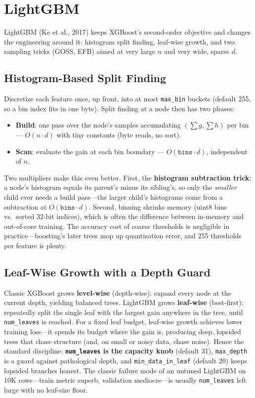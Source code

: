 \section{LightGBM}
\label{cml:sec:lightgbm}

LightGBM (Ke et al., 2017) keeps XGBoost's second-order objective and changes the engineering around it: histogram split finding, leaf-wise growth, and two sampling tricks (GOSS, EFB) aimed at very large $n$ and very wide, sparse $d$.

\subsection{Histogram-Based Split Finding}

Discretize each feature once, up front, into at most \texttt{max\_bin} buckets (default 255, so a bin index fits in one byte). Split finding at a node then has two phases:
\begin{itemize}
    \item \textbf{Build}: one pass over the node's samples accumulating $(\sum g, \sum h)$ per bin --- $O(n \cdot d)$ with tiny constants (byte reads, no sort).
    \item \textbf{Scan}: evaluate the gain at each bin boundary --- $O(\texttt{bins} \cdot d)$, independent of $n$.
\end{itemize}
Two multipliers make this even better. First, the \textbf{histogram subtraction trick}: a node's histogram equals its parent's minus its sibling's, so only the \textit{smaller} child ever needs a build pass---the larger child's histograms come from a subtraction at $O(\texttt{bins} \cdot d)$. Second, binning shrinks memory (uint8 bins vs.\ sorted 32-bit indices), which is often the difference between in-memory and out-of-core training. The accuracy cost of coarse thresholds is negligible in practice---boosting's later trees mop up quantization error, and 255 thresholds per feature is plenty.

\subsection{Leaf-Wise Growth with a Depth Guard}

Classic XGBoost grows \textbf{level-wise} (depth-wise): expand every node at the current depth, yielding balanced trees. LightGBM grows \textbf{leaf-wise} (best-first): repeatedly split the single leaf with the largest gain anywhere in the tree, until \texttt{num\_leaves} is reached. For a fixed leaf budget, leaf-wise growth achieves lower training loss---it spends its budget where the gain is, producing deep, lopsided trees that chase structure (and, on small or noisy data, chase noise). Hence the standard discipline: \textbf{\texttt{num\_leaves} is the capacity knob} (default 31), \texttt{max\_depth} is a guard against pathological depth, and \texttt{min\_data\_in\_leaf} (default 20) keeps lopsided branches honest. The classic failure mode of an untuned LightGBM on 10K rows---train metric superb, validation mediocre---is usually \texttt{num\_leaves} left large with no leaf-size floor.


